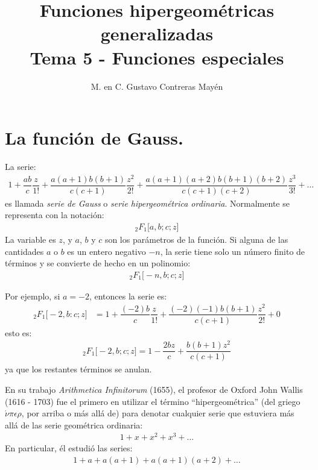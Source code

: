 
\title{Funciones hipergeométricas generalizadas \\ \large {Tema 5 - Funciones especiales} \vspace{-3ex}}
\author{M. en C. Gustavo Contreras Mayén}
\date{ }

\vspace{-4cm}
\maketitle
\fontsize{14}{14}\selectfont
\tableofcontents
\newpage


\section{La función de Gauss.}

La serie:
\begin{align}
1 + \dfrac{a b}{c} \dfrac{z}{1!} + \dfrac{a (a {+} 1) b (b {+} 1)}{c( c {+} 1)} \dfrac{z^{2}}{2!} + \dfrac{a (a {+} 1)(a {+} 2) b (b {+} 1)(b {+} 2)}{c (c {+} 1)(c {+} 2)} \dfrac{z^{3}}{3!} + \ldots
\label{eq:ecuacion_01_01_01}
\end{align}
es llamada \emph{serie de Gauss} o \emph{serie hipergeométrica ordinaria}. Normalmente se representa con la notación:
\begin{align*}
{}_{2} F_{1} \big[ a, b; c; z \big]
\end{align*}
La variable es $z$, y $a$, $b$ y $c$ son los parámetros  de la función. Si alguna de las cantidades $a$ o $b$ es un entero negativo $-n$, la serie tiene solo un número finito de términos y se convierte de hecho en un polinomio:
\begin{align*}
{}_{2} F_{1} \big[ -n, b; c; z \big]
\end{align*}

Por ejemplo, si $a = -2$, entonces la serie es:
\begin{align*}
{}_{2} F_{1} \big[ -2, b: c; z \big] &= 1 + \dfrac{(-2) b}{c} \dfrac{z}{1!} + \dfrac{(-2) (-1) b (b + 1)}{c( c + 1)} \dfrac{z^{2}}{2!} + 0 
\end{align*}    
esto es:
\begin{align}
{}_{2} F_{1} \big[ -2, b; c; z \big] = 1 - \dfrac{2 b z}{c} + \dfrac{b( b + 1) z^{2}}{c (c + 1)}
\label{eq:ecuacion_01_01_02}
\end{align}
ya que los restantes términos se anulan.
\par
En su trabajo \emph{Arithmetica Infinitorum} (1655), el profesor de Oxford John Wallis (1616 - 1703) fue el primero en utilizar el término \enquote{hipergeométrica} (del griego $\acute{\nu} \pi \epsilon \rho$, por arriba o más allá de) para denotar cualquier serie que estuviera más allá de las serie geométrica ordinaria:
\begin{align*}
1 + x + x^{2} + x^{3} + \ldots
\end{align*}
En particular, él estudió las series:
\begin{align*}
1 + a + a( a + 1) + a (a + 1)(a + 2) + \ldots
\end{align*}

